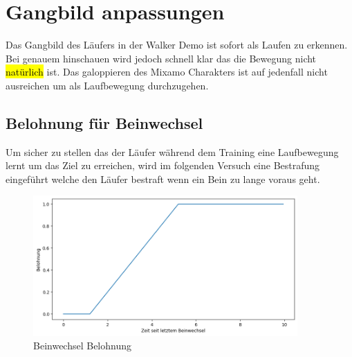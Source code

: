 \section{Gangbild anpassungen}
Das Gangbild des Läufers in der Walker Demo ist sofort als Laufen zu erkennen. Bei genauem hinschauen wird jedoch schnell klar das die Bewegung nicht \hl{natürlich} ist. Das galoppieren des Mixamo Charakters ist auf jedenfall nicht ausreichen um als Laufbewegung durchzugehen.

\subsection{Belohnung für Beinwechsel}
Um sicher zu stellen das der Läufer während dem Training eine Laufbewegung lernt um das Ziel zu erreichen, wird im folgenden Versuch eine Bestrafung eingeführt welche den Läufer bestraft wenn ein Bein zu lange voraus geht.
\begin{figure}[H]
  \centering
  \includegraphics[width=0.9\textwidth]{img/plot_beinwechsel} 
  \caption{Beinwechsel Belohnung}
  \label{fig:plot_beinwechsel}
\end{figure}


